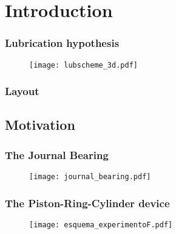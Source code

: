 \documentclass[10pt,aspectratio=169]{beamer}
\begin{document}
\setcounter{showProgressBar}{0}
\setcounter{showSlideNumbers}{1}

\frame{\titlepage}

\setcounter{showSlideNumbers}{0}
\section{Introduction}
\setcounter{showSlideNumbers}{1}


\begin{frame}
\frametitle{Lubrication hypothesis}
\vspace*{0.5cm}
\begin{figure}\hspace*{-0.3cm}
	\texttt{[image: lubscheme\_3d.pdf]}
\end{figure}
\end{frame}


\setcounter{showSlideNumbers}{0}
\begin{frame}[noframenumbering]
\frametitle{Layout}
\tableofcontents[hideallsubsections]
\end{frame}
\setcounter{showSlideNumbers}{1}

\subsection{Motivation}

\begin{frame}
\frametitle{The Journal Bearing}
\vspace*{0.7cm}
\begin{figure}
	\centering
	\texttt{[image: journal\_bearing.pdf]}
\end{figure}

\end{frame}


\begin{frame}
\frametitle{The Piston-Ring-Cylinder device}
\vspace*{0.5cm}
\begin{figure}\hspace*{-0.3cm}
	\texttt{[image: esquema\_experimentoF.pdf]}
\end{figure}
\end{frame}
\end{document}
